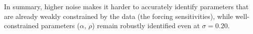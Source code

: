 \documentclass{article}
\begin{document}
\begin{enumerate}
\begin{answer}
In summary, higher noise makes it harder to accurately identify parameters that are already weakly constrained by the data (the forcing sensitivities), while well-constrained parameters ($\alpha$, $\rho$) remain robustly identified even at $\sigma = 0.20$.
\end{answer}

\end{enumerate}
\end{document}
